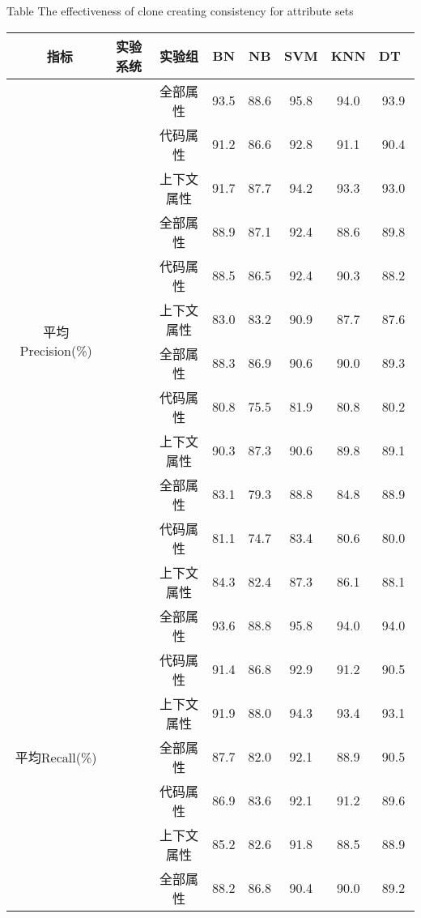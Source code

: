 \begin{table} [htbp]
\renewcommand\arraystretch{0.9} 
{Table$\!$}
{The effectiveness of clone creating consistency for attribute sets}
\vspace{0.5em}
\centering
\wuhao
\begin{tabular}{cccccccc}
\toprule[1.5pt]
~{指标}&{实验系统}&{实验组}&{BN}&{NB}&{SVM}&{KNN}&{DT}~\\
\midrule[1pt]
\multirow{12}{*}{平均Precision(\%)}
&~\multirow{3}{*}{ArgoUML}
&全部属性& 93.5    & 88.6  &95.8 & 94.0  & 93.9 \\
& & 代码属性& 91.2    & 86.6  & 92.8 & 91.1 & 90.4 \\
&  & 上下文属性& 91.7    & 87.7  & 94.2 & 93.3 &93.0  \\
\cline{2-8}
&~\multirow{3}{*}{jEdit}
& 全部属性& 88.9    & 87.1  & 92.4 &88.6 & 89.8 \\
&    &代码属性& 88.5    & 86.5  & 92.4 & 90.3 & 88.2 \\
&    &  上下文属性 & 83.0     &83.2  & 90.9 & 87.7 & 87.6 \\
\cline{2-8}
&~\multirow{3}{*}{jFreeChart}
& 全部属性& 88.3    & 86.9  &90.6 &90.0  & 89.3 \\
&  &代码属性 & 80.8    & 75.5  & 81.9 & 80.8 & 80.2 \\
&  & 上下文属性& 90.3    & 87.3  & 90.6 & 89.8 & 89.1 \\
\cline{2-8}
&~\multirow{3}{*}{Tuxguitar} 
&全部属性 & 83.1    & 79.3  & 88.8 & 84.8 & 88.9 \\
&   &代码属性& 81.1    & 74.7  & 83.4 & 80.6 & 80.0   \\
&    &  上下文属性& 84.3    & 82.4  & 87.3 & 86.1 & 88.1 \\
\hline
\multirow{12}{*}{平均Recall(\%)}&
~\multirow{3}{*}{ArgoUML}
&全部属性 & 93.6    & 88.8  & 95.8 & 94.0  & 94.0  \\
&   &代码属性 & 91.4    & 86.8  & 92.9 & 91.2 & 90.5 \\
&   &  上下文属性& 91.9    & 88.0   & 94.3 & 93.4 & 93.1 \\
\cline{2-8}
&~\multirow{3}{*}{jEdit}
& 全部属性& 87.7    & 82.0   & 92.1 & 88.9 & 90.5 \\
&   &代码属性 & 86.9    & 83.6  & 92.1 & 91.2 & 89.6 \\
&   &  上下文属性& 85.2    & 82.6  & 91.8 & 88.5 & 88.9 \\
\cline{2-8}
&~\multirow{3}{*}{jFreeChart} 
 & 全部属性 & 88.2    & 86.8  & 90.4 & 90.0   & 89.2 \\

\end{tabular}
\end{table}
